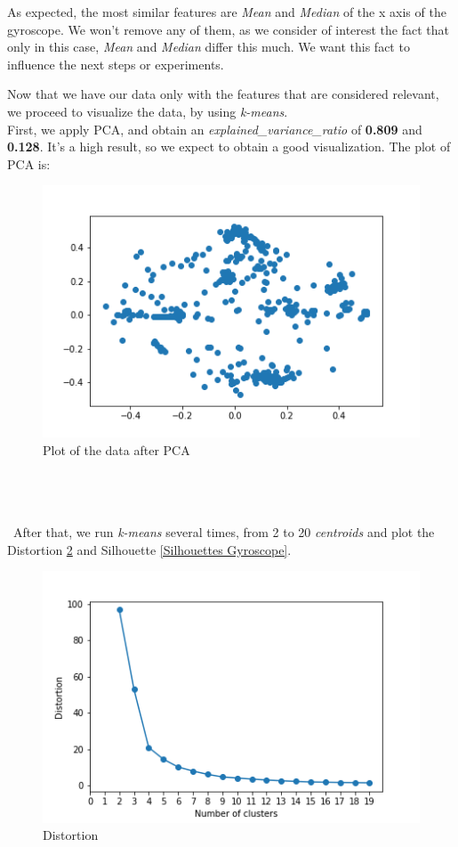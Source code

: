 \documentclass[idxtotoc,hyperref,openany]{labbook} %
\begin{document}
As expected, the most similar features are \textit{Mean} and \textit{Median} of the x axis of the gyroscope. We won't remove any of them, as we consider of interest the fact that only in this case, \textit{Mean} and \textit{Median} differ this much. We want this fact to influence the next steps or experiments.

\clearpage
Now that we have our data only with the features that are considered relevant, we proceed to visualize the data, by using \textit{k-means}.\\

First, we apply PCA, and obtain an \textit{explained\_variance\_ratio} of \textbf{0.809} and \textbf{0.128}. It's a high result, so we expect to obtain a good visualization. The plot of PCA is:

\begin{figure}[h]
\includegraphics[width=0.9\linewidth]{2710/PCA_Plot_Gyroscope.png}
\setlength\belowcaptionskip{-10pt}
\caption{Plot of the data after PCA}
\label{Plot Gyroscope}
\end{figure}  

\textit{  }\\\\\\\
After that, we run \textit{k-means} several times, from 2 to 20 \textit{centroids} and plot the Distortion \ref{Distortion Gyroscope} and Silhouette \ref{Silhouettes Gyroscope}.

\begin{figure}[h]
\includegraphics[width=0.9\linewidth]{2710/KMeans_Distortion_Gyroscope.png}
\setlength\belowcaptionskip{-10pt}
\caption{Distortion}
\label{Distortion Gyroscope}
\end{figure}  
\end{document}
